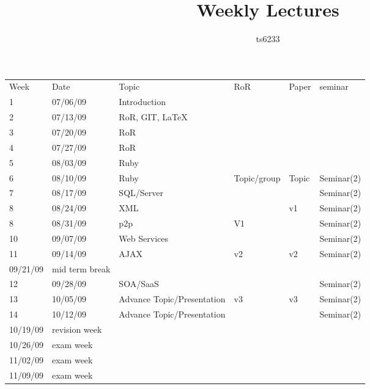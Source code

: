 \documentclass[12pt]{article}
\title{Weekly Lectures}
\author{ts6233}
\date{}
\begin{document}
\nocite{*}

\maketitle
\begin{landscape}
\begin{tabular}{@{}llllll@{}} \toprule			
Week &	Date & 	Topic & 	RoR & 	Paper & 	seminar \\ \cmidrule{1-6}	
1 &	07/06/09	& Introduction &	&	&	\\
2 &	07/13/09	& RoR, GIT, LaTeX &	&	&	\\
3 &	07/20/09	& RoR &	&	&	\\
4 &	07/27/09	& RoR &	&	&	\\ \cmidrule{1-6}
5 &	08/03/09	& Ruby &	&	&	\\
6 &	08/10/09	& Ruby &	Topic/group  &	Topic &	Seminar(2) \\
7 &	08/17/09	& SQL/Server &	&	&	Seminar(2)\\
8 &	08/24/09	& XML &	&	v1&	Seminar(2)\\
8 &	08/31/09	& p2p &	V1 &	&	Seminar(2)\\ \cmidrule{1-6}
10 &	09/07/09	& Web Services &	&	&	Seminar(2) \\
11 &	09/14/09	& AJAX &	v2&	v2&	Seminar(2)\\
	09/21/09	& mid term break	&	&	\\
12 &	09/28/09	& SOA/SaaS &	&	&	Seminar(2)\\ \cmidrule{1-6}
13 &	10/05/09	& Advance Topic/Presentation &	v3&	v3&	Seminar(2)\\
14 &	10/12/09	& Advance Topic/Presentation &	&	&	Seminar(2)\\
	10/19/09	& revision week	&	&	\\
	10/26/09	& exam week	&	&	\\
	11/02/09	& exam week	&	&	\\
	11/09/09	& exam week	&	&	\\ \bottomrule
\end{tabular}
\end{landscape}
\end{document}
